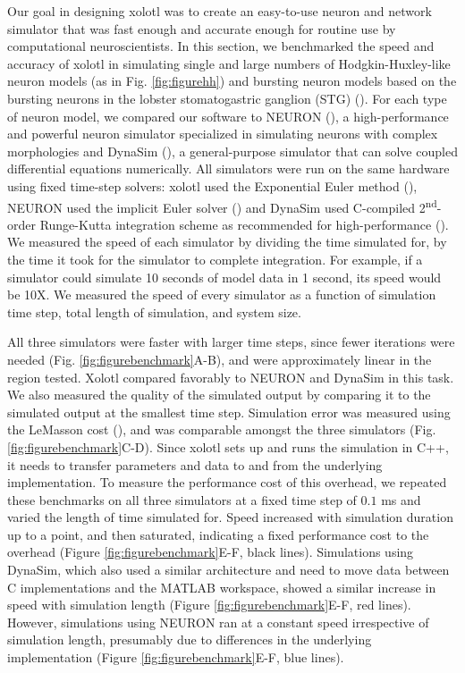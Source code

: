 \documentclass{frontiersSCNS} %
\begin{document}
Our goal in designing xolotl was to create an easy-to-use neuron and network simulator that was fast enough and accurate enough for routine use by computational neuroscientists. In this section, we benchmarked the speed and accuracy of xolotl in simulating single and large numbers of Hodgkin-Huxley-like neuron models (as in Fig. \ref{fig:figurehh}) and bursting neuron models based on the bursting neurons in the lobster stomatogastric ganglion (STG) (\cite{prinzSimilarNetworkActivity2004}). For each type of neuron model, we compared our software to  NEURON (\cite{hinesNEURONSimulationEnvironment1997}), a high-performance and powerful neuron simulator specialized in simulating neurons with complex morphologies and DynaSim (\cite{sherfeyDynaSimMATLABToolbox2018}), a general-purpose simulator that can solve coupled differential equations numerically. All simulators were run on the same hardware using fixed time-step solvers: xolotl used the Exponential Euler method (\cite{dayanTheoreticalNeuroscience2001}), NEURON used the  implicit Euler solver (\cite{hinesNEURONSimulationEnvironment1997}) and DynaSim used C-compiled 2\textsuperscript{nd}-order Runge-Kutta integration scheme as recommended for high-performance (\cite{sherfeyDynaSimMATLABToolbox2018}). We measured the speed of each simulator by dividing the time simulated for, by the time it took for the simulator to complete integration. For example, if a simulator could simulate 10 seconds of model data in 1 second, its speed would be 10X. We measured the speed of every simulator as a function of simulation time step, total length of simulation, and system size. 

All three simulators were faster with larger time steps, since fewer iterations were needed (Fig. \ref{fig:figurebenchmark}A-B), and were approximately linear in the region tested. Xolotl compared favorably to NEURON and DynaSim in this task. We also measured the quality of the simulated output by comparing it to the simulated output at the smallest time step. Simulation error was measured using the LeMasson cost (\cite{lemassonIntroductionEquationSolving2000}), and was comparable amongst the three simulators (Fig. \ref{fig:figurebenchmark}C-D). Since xolotl sets up and runs the simulation in C++, it needs to transfer parameters and data to and from the underlying implementation. To measure the performance cost of this overhead, we repeated these benchmarks on all three simulators at a fixed time step of $0.1$ ms and varied the length of time simulated for. Speed increased with simulation duration up to a point, and then saturated, indicating a fixed performance cost to the overhead (Figure \ref{fig:figurebenchmark}E-F, black lines). Simulations using DynaSim, which also used a similar architecture and need to move data between C implementations and the MATLAB workspace, showed a similar increase in speed with simulation length (Figure \ref{fig:figurebenchmark}E-F, red lines). However, simulations using NEURON ran at a constant speed irrespective of simulation length, presumably due to differences in the underlying implementation (Figure \ref{fig:figurebenchmark}E-F, blue lines).    
\end{document}
